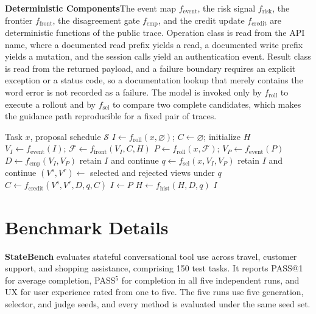 \documentclass{article}
\newcommand{\method}{RISE\xspace}
\begin{document}
\textbf{Deterministic Components}\quad The event map $f_{\mathrm{event}}$, the risk signal $f_{\mathrm{risk}}$, the frontier $f_{\mathrm{front}}$, the disagreement gate $f_{\mathrm{cmp}}$, and the credit update $f_{\mathrm{credit}}$ are deterministic functions of the public trace. Operation class is read from the API name, where a documented read prefix yields a read, a documented write prefix yields a mutation, and the session calls yield an authentication event. Result class is read from the returned payload, and a failure boundary requires an explicit exception or a status code, so a documentation lookup that merely contains the word error is not recorded as a failure. The model is invoked only by $f_{\mathrm{roll}}$ to execute a rollout and by $f_{\mathrm{sel}}$ to compare two complete candidates, which makes the guidance path reproducible for a fixed pair of traces.

\begin{algorithm}[H]
\caption{\method}
\label{alg:rise}
\small
\begin{algorithmic}[1]
\Require Task $x$, proposal schedule $\mathcal{S}$
\State $I\gets f_{\mathrm{roll}}(x,\varnothing)$; $C\gets\varnothing$; initialize $H$
  \State $V_I\gets f_{\mathrm{event}}(I)$; $\mathcal{F}\gets f_{\mathrm{front}}(V_I,C,H)$
  \State $P\gets f_{\mathrm{roll}}(x,\mathcal{F})$; $V_P\gets f_{\mathrm{event}}(P)$
  \State $D\gets f_{\mathrm{cmp}}(V_I,V_P)$
    \State retain $I$ and continue
  \EndIf
  \State $q\gets f_{\mathrm{sel}}(x,V_I,V_P)$
    \State retain $I$ and continue
  \EndIf
  \State $(V^s,V^r)\gets$ selected and rejected views under $q$
  \State $C\gets f_{\mathrm{credit}}(V^s,V^r,D,q,C)$
   \State $I\gets P$ \EndIf
  \State $H\gets f_{\mathrm{hist}}(H,D,q)$
\EndFor
\State \Return $I$
\end{algorithmic}
\end{algorithm}



\section{Benchmark Details}
\label{app:benchmarks}
\textbf{StateBench} evaluates stateful conversational tool use across travel, customer support, and shopping assistance, comprising 150 test tasks. It reports PASS@1 for average completion, PASS$^5$ for completion in all five independent runs, and UX for user experience rated from one to five. The five runs use five generation, selector, and judge seeds, and every method is evaluated under the same seed set.
\end{document}
